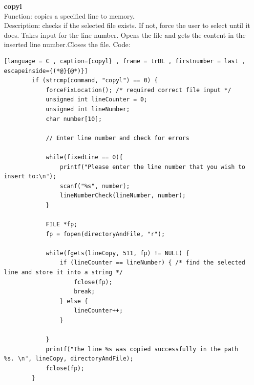 \documentclass[a4paper]{article}
\theoremstyle{plain}
\theoremstyle{definition}
\theoremstyle{remark}
\begin{document}
\textbf{copyl} \\
Function: copies a specified line to memory. \\
Description: checks if the selected file exists. If not, force the user to select until it does. Takes input for the line number. Opens the file and gets the content in the inserted line number.Closes the file.
Code:
\begin{lstlisting}[language = C , caption={copyl} , frame = trBL , firstnumber = last , escapeinside={(*@}{@*)}]
		if (strcmp(command, "copyl") == 0) {
			forceFixLocation(); /* required correct file input */
			unsigned int lineCounter = 0;
			unsigned int lineNumber;
			char number[10];

			// Enter line number and check for errors

			while(fixedLine == 0){
				printf("Please enter the line number that you wish to insert to:\n");
				scanf("%s", number);
				lineNumberCheck(lineNumber, number);
			}

			FILE *fp;
			fp = fopen(directoryAndFile, "r");

			while(fgets(lineCopy, 511, fp) != NULL) {
				if (lineCounter == lineNumber) { /* find the selected line and store it into a string */
					fclose(fp);
					break;
				} else {
					lineCounter++;
				}

			}
			printf("The line %s was copied successfully in the path %s. \n", lineCopy, directoryAndFile);
			fclose(fp);
		}
\end{lstlisting}
\end{document}
